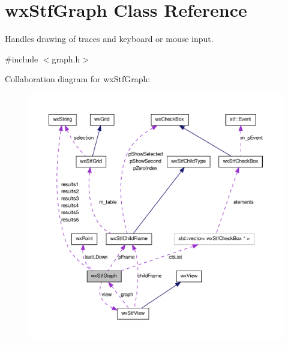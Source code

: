 \hypertarget{classwxStfGraph}{
\section{wxStfGraph Class Reference}
\label{classwxStfGraph}
}


Handles drawing of traces and keyboard or mouse input.  




{\ttfamily \#include $<$graph.h$>$}



Collaboration diagram for wxStfGraph:
\nopagebreak
\begin{figure}[H]
\begin{center}
\leavevmode
\includegraphics[width=400pt]{classwxStfGraph__coll__graph}
\end{center}
\end{figure}
